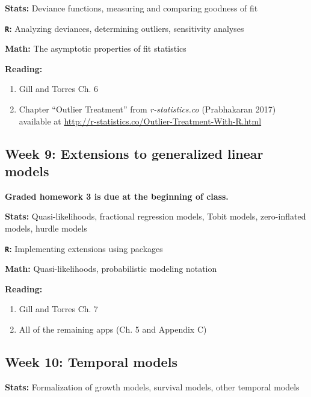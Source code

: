 \documentclass[12pt]{article}
\begin{document}
\noindent \textbf{Stats:} Deviance functions, measuring and comparing goodness of fit

\noindent \textbf{\texttt{R}:} Analyzing deviances, determining outliers, sensitivity analyses

\noindent \textbf{Math:} The asymptotic properties of fit statistics

\noindent \textbf{Reading:}

\begin{enumerate}[1)]

\item Gill and Torres Ch. 6

\item Chapter ``Outlier Treatment'' from \emph{r-statistics.co} (Prabhakaran 2017) available at \href{http://r-statistics.co/Outlier-Treatment-With-R.html}{http://r-statistics.co/Outlier-Treatment-With-R.html}

\end{enumerate}

\subsection*{Week 9: Extensions to generalized linear models}

\noindent \textbf{Graded homework 3 is due at the beginning of class.}

\noindent \textbf{Stats:} Quasi-likelihoods, fractional regression models, Tobit models, zero-inflated models, hurdle models

\noindent \textbf{\texttt{R}:} Implementing extensions using packages

\noindent \textbf{Math:} Quasi-likelihoods, probabilistic modeling notation

\noindent \textbf{Reading:}

\begin{enumerate}[1)]

\item Gill and Torres Ch. 7

\item All of the remaining apps (Ch. 5 and Appendix C)

\end{enumerate}

\subsection*{Week 10: Temporal models}

\noindent \textbf{Stats:} Formalization of growth models, survival models, other temporal models
\end{document}
